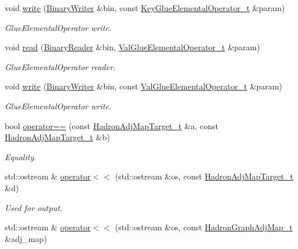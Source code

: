 \begin{DoxyCompactItemize}
void \mbox{\hyperlink{namespaceHadron_a91e2c5264aeab6dfb2be779cf7140626}{write}} (\mbox{\hyperlink{classADATIO_1_1BinaryWriter}{Binary\+Writer}} \&bin, const \mbox{\hyperlink{structHadron_1_1KeyGlueElementalOperator__t}{Key\+Glue\+Elemental\+Operator\+\_\+t}} \&param)
\begin{DoxyCompactList}\small\item\em Glue\+Elemental\+Operator write. \end{DoxyCompactList}\item 
void \mbox{\hyperlink{namespaceHadron_a9991ac06f4136479286a214307cd17dc}{read}} (\mbox{\hyperlink{classADATIO_1_1BinaryReader}{Binary\+Reader}} \&bin, \mbox{\hyperlink{structHadron_1_1ValGlueElementalOperator__t}{Val\+Glue\+Elemental\+Operator\+\_\+t}} \&param)
\begin{DoxyCompactList}\small\item\em Glue\+Elemental\+Operator reader. \end{DoxyCompactList}\item 
void \mbox{\hyperlink{namespaceHadron_aee7b5924c79af024abb8c3d99f7e8b34}{write}} (\mbox{\hyperlink{classADATIO_1_1BinaryWriter}{Binary\+Writer}} \&bin, const \mbox{\hyperlink{structHadron_1_1ValGlueElementalOperator__t}{Val\+Glue\+Elemental\+Operator\+\_\+t}} \&param)
\begin{DoxyCompactList}\small\item\em Glue\+Elemental\+Operator write. \end{DoxyCompactList}\item 
bool \mbox{\hyperlink{namespaceHadron_a89bb389d765cff67405fdb2d27b9b289}{operator==}} (const \mbox{\hyperlink{structHadron_1_1HadronAdjMapTarget__t}{Hadron\+Adj\+Map\+Target\+\_\+t}} \&a, const \mbox{\hyperlink{structHadron_1_1HadronAdjMapTarget__t}{Hadron\+Adj\+Map\+Target\+\_\+t}} \&b)
\begin{DoxyCompactList}\small\item\em Equality. \end{DoxyCompactList}\item 
std\+::ostream \& \mbox{\hyperlink{namespaceHadron_ad9b3f6b8246d630d96e54032def25900}{operator$<$$<$}} (std\+::ostream \&os, const \mbox{\hyperlink{structHadron_1_1HadronAdjMapTarget__t}{Hadron\+Adj\+Map\+Target\+\_\+t}} \&d)
\begin{DoxyCompactList}\small\item\em Used for output. \end{DoxyCompactList}\item 
std\+::ostream \& \mbox{\hyperlink{namespaceHadron_aefc74b3ac5cc28e73ed7a9e24b032449}{operator$<$$<$}} (std\+::ostream \&os, const \mbox{\hyperlink{namespaceHadron_ad6387ffed6a1bf53021dce29b71d3a04}{Hadron\+Graph\+Adj\+Map\+\_\+t}} \&adj\+\_\+map)

\end{DoxyCompactItemize}
